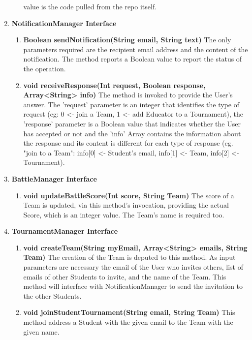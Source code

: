 \begin{enumerate}
\begin{enumerate}[label=$\bullet$]
            value is the code pulled from the repo itself.
        \end{enumerate} 
    \item \textbf{NotificationManager Interface}
        \begin{enumerate}[label=$\bullet$]
            \item \textbf{Boolean sendNotification(String email, String text)} The only parameters required are the recipient email address and the content of the notification. The method reports a Boolean value to report the status 
            of the operation.
            \item \textbf{void receiveResponse(Int request, Boolean response, Array<String> info)} The method is invoked to provide the User's answer. The 'request' parameter is an integer that identifies the type of request 
            (eg: 0 <- join a Team, 1 <- add Educator to a Tournament), the 'response' parameter is a Boolean value that indicates whether the User has accepted or not and the 'info' Array contains the information about the response 
            and its content is different for each type of response (eg. "join to a Team": info[0] <- Student's email, info[1] <- Team, info[2] <- Tournament).
        \end{enumerate}
    \item \textbf{BattleManager Interface}
        \begin{enumerate}[label=$\bullet$]
            \item \textbf{void updateBattleScore(Int score, String Team)} The score of a Team is updated, via this method's invocation, providing the actual Score, which is an integer value. The Team's name is required too.
        \end{enumerate}
    \item \textbf{TournamentManager Interface}
        \begin{enumerate}[label=$\bullet$]
        \item \textbf{void createTeam(String myEmail, Array<String> emails, String Team)} The creation of the Team is deputed to this method. As input parameters are necessary the email of the User who invites others, list of emails 
        of other Students to invite, and the name of the Team. This method will interface with NotificationManager to send the invitation to the other Students. 
        \item \textbf{void joinStudentTournament(String email, String Team)} This method address a Student with the given email to the Team with the given name.

\end{enumerate}
\end{enumerate}
